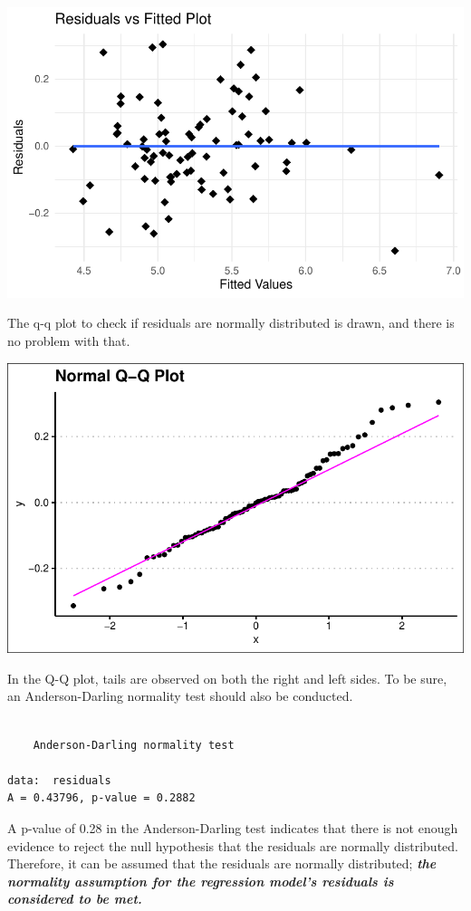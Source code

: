 \documentclass[
  11pt,
  a4paper,
  DIV=11,
  numbers=noendperiod]{scrartcl}
\begin{document}
\includegraphics{project_files/figure-pdf/unnamed-chunk-41-1.pdf}

The q-q plot to check if residuals are normally distributed is drawn,
and there is no problem with that.

\includegraphics{project_files/figure-pdf/unnamed-chunk-42-1.pdf}

In the Q-Q plot, tails are observed on both the right and left sides. To
be sure, an Anderson-Darling normality test should also be conducted.

\begin{verbatim}

    Anderson-Darling normality test

data:  residuals
A = 0.43796, p-value = 0.2882
\end{verbatim}

A p-value of 0.28 in the Anderson-Darling test indicates that there is
not enough evidence to reject the null hypothesis that the residuals are
normally distributed. Therefore, it can be assumed that the residuals
are normally distributed; \textbf{\emph{the normality assumption for the
regression model's residuals is considered to be met.}}
\end{document}
